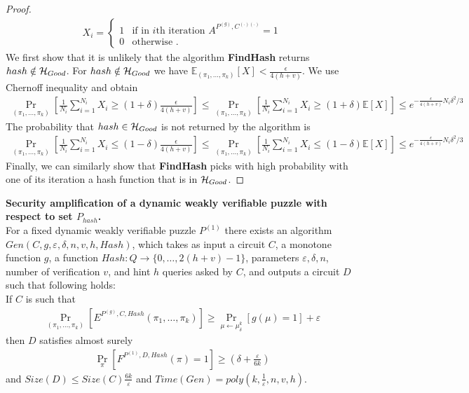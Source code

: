 \begin{proof}
\begin{align*}
  X_i =
  \begin{cases}
    1 & \text{if in $i$th iteration $A^{P^{(g)}, C^{(.)(.)}} = 1$}\\
    0 & \text{otherwise .}
  \end{cases}
\end{align*}
We first show that it is unlikely that the algorithm \textbf{FindHash} returns $hash \notin \mathcal{H}_{Good}$.
For $hash \notin \mathcal{H}_{Good}$ we have $\mathbb{E}_{(\pi_1, \dots, \pi_k)}[X] < \frac{\epsilon}{4(h+v)}$.
We use Chernoff inequality and obtain
\begin{align*}
  \underset{(\pi_1, \dots, \pi_k)}{\Pr} \left[\frac{1}{N_i} \sum_{i=1}^{N_i} X_i \geq (1 + \delta) \frac{\epsilon}{4(h+v)} \right] \leq
  \underset{(\pi_1, \dots, \pi_k)}{\Pr}\left[\frac{1}{N_i} \sum_{i=1}^{N_i} X_i \geq (1 + \delta) \mathbb{E}[X]\right] \leq
  e^{-{\frac{\epsilon}{4(h+v)}} N_i \delta^2 /3}
\end{align*}
%
The probability that $hash \in \mathcal{H}_{Good}$ is not returned by the algorithm is
\begin{align*}
  \underset{(\pi_1, \dots, \pi_k)}{\Pr}[\frac{1}{N_i} \sum_{i=1}^{N_i} X_i \leq (1 - \delta) \frac{\epsilon}{4(h+v)}] \leq
  \underset{(\pi_1, \dots, \pi_k)}{\Pr}[\frac{1}{N_i} \sum_{i=1}^{N_i} X_i \leq (1 - \delta) \mathbb{E}[X]] \leq e^{-{\frac{\epsilon}{4(h+v)}} N_i \delta^2 /3}
\end{align*}
%
Finally, we can similarly show that \textbf{FindHash} picks with high probability with one of its iteration a hash function that is in $\mathcal{H}_{Good}$.
%
\end{proof}
%
%
\begin{lemma}\textbf{Security amplification of a dynamic weakly verifiable puzzle with respect to set $P_{hash}$.} \\
  For a fixed dynamic weakly verifiable puzzle $P^{(1)}$ there exists an algorithm\\
  $Gen(C, g, \varepsilon, \delta, n, v, h, Hash)$, which takes as input a circuit $C$, a monotone function $g$,
  a function $Hash : Q \rightarrow \{0, \dots, 2(h+v)-1\}$, parameters $\varepsilon, \delta, n$,
  number of verification $v$, and hint $h$ queries asked by $C$, and outputs a circuit $D$
  such that following holds: \\
  If $C$ is such that \\
  \begin{align*}
    \underset{(\pi_1, \dots, \pi_k)}{\Pr}[E^{P^{(g)}, C, Hash}(\pi_1, \dots, \pi_k)] \geq \underset{\mu \leftarrow \mu_\delta^k}{\Pr}[g(\mu) = 1] + \varepsilon
  \end{align*}
  then $D$ satisfies almost surely
  \begin{align*}
    \underset{\pi}{\Pr}[F^{P^{(1)},D, Hash}(\pi) = 1] \geq (\delta + \frac{\varepsilon}{6k})
  \end{align*}
  and $Size(D) \leq Size(C)\frac{6k}{\varepsilon}$ and $Time(Gen) = poly(k, \frac{1}{\varepsilon}, n, v, h)$.
\end{lemma}
